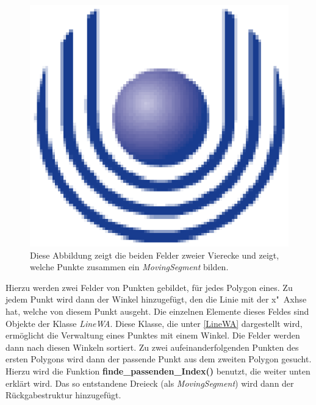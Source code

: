 \begin{figure}
	\centering
	\includegraphics{feu_logo2.eps}
	\caption[Tabellendarstellung des ,,rotating Plane'']{Diese Abbildung zeigt die beiden Felder zweier Vierecke und zeigt, welche Punkte zusammen ein \textit{MovingSegment} bilden.}
	\label{fig:RotatinPane}
\end{figure}


Hierzu werden zwei Felder von Punkten gebildet, für jedes Polygon eines. Zu jedem Punkt wird dann der Winkel hinzugefügt, den die Linie mit der x"~Axhse hat, welche von diesem Punkt ausgeht. Die einzelnen Elemente dieses Feldes sind Objekte der Klasse \textit{LineWA}. Diese Klasse, die unter \vref{LineWA} dargestellt wird, ermöglicht die Verwaltung eines Punktes mit einem Winkel.  Die Felder werden dann nach diesen Winkeln sortiert. Zu zwei aufeinanderfolgenden Punkten des ersten Polygons wird dann der passende Punkt aus dem zweiten Polygon gesucht. Hierzu wird die Funktion \textbf{finde\_passenden\_Index()} benutzt, die weiter unten erklärt wird. Das so entstandene Dreieck (als \textit{MovingSegment}) wird dann der Rückgabestruktur hinzugefügt.

